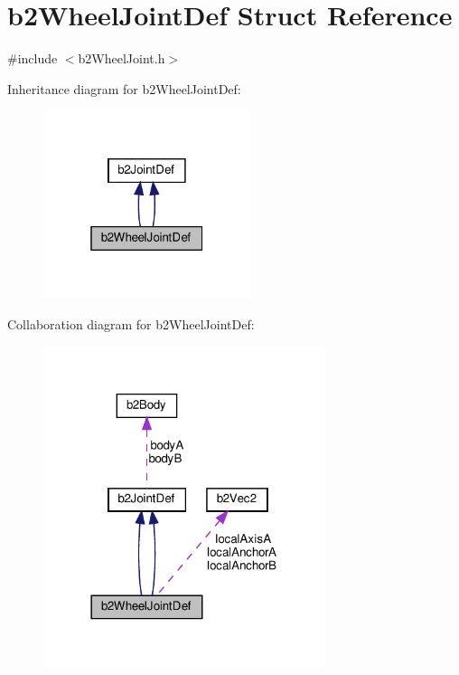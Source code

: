 \hypertarget{structb2WheelJointDef}{}\section{b2\+Wheel\+Joint\+Def Struct Reference}
\label{structb2WheelJointDef}


{\ttfamily \#include $<$b2\+Wheel\+Joint.\+h$>$}



Inheritance diagram for b2\+Wheel\+Joint\+Def\+:
\nopagebreak
\begin{figure}[H]
\begin{center}
\leavevmode
\includegraphics[width=172pt]{structb2WheelJointDef__inherit__graph}
\end{center}
\end{figure}


Collaboration diagram for b2\+Wheel\+Joint\+Def\+:
\nopagebreak
\begin{figure}[H]
\begin{center}
\leavevmode
\includegraphics[width=234pt]{structb2WheelJointDef__coll__graph}
\end{center}
\end{figure}
